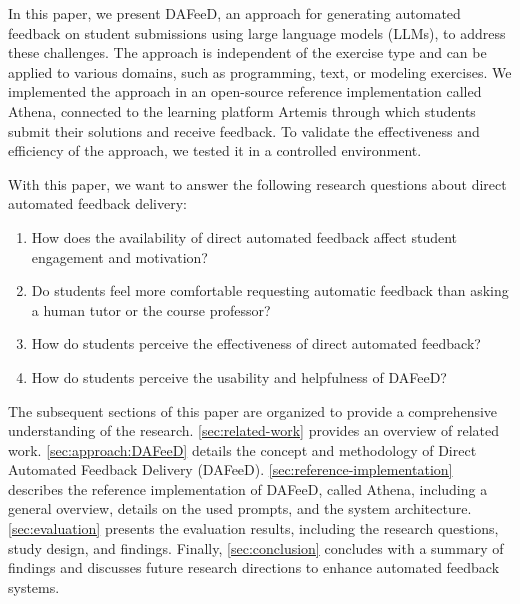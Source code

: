 \documentclass[manuscript,screen,review]{acmart}
\begin{document}
In this paper, we present DAFeeD, an approach for generating automated feedback on student submissions using large language models (LLMs), to address these challenges.
The approach is independent of the exercise type and can be applied to various domains, such as programming, text, or modeling exercises.
We implemented the approach in an open-source reference implementation called Athena, connected to the learning platform Artemis through which students submit their solutions and receive feedback.
To validate the effectiveness and efficiency of the approach, we tested it in a controlled environment. 

With this paper, we want to answer the following research questions about direct automated feedback delivery:

\begin{enumerate}[label=\textbf{RQ\arabic*},ref=RQ\arabic*]
  \item \label{RQ1} How does the availability of direct automated feedback affect student engagement and motivation? 
  \item \label{RQ2} Do students feel more comfortable requesting automatic feedback than asking a human tutor or the course professor?
  \item \label{RQ3} How do students perceive the effectiveness of direct automated feedback?
  \item \label{RQ4} How do students perceive the usability and helpfulness of DAFeeD?
\end{enumerate}


The subsequent sections of this paper are organized to provide a comprehensive understanding of the research. 
\cref{sec:related-work} provides an overview of related work. 
\cref{sec:approach:DAFeeD} details the concept and methodology of Direct Automated Feedback Delivery (DAFeeD).
\cref{sec:reference-implementation} describes the reference implementation of DAFeeD, called Athena, including a general overview, details on the used prompts, and the system architecture. 
\cref{sec:evaluation} presents the evaluation results, including the research questions, study design, and findings. 
Finally, \cref{sec:conclusion} concludes with a summary of findings and discusses future research directions to enhance automated feedback systems.
\end{document}
